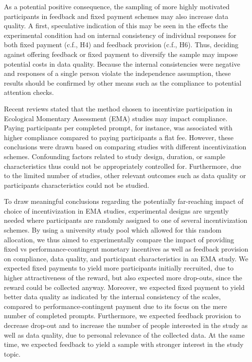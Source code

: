 \documentclass[authordate, empirical,issue]{jote-new-article}
\begin{document}
As a potential positive consequence, the sampling of more highly motivated participants in feedback and fixed payment schemes may also increase data quality. A first, speculative indication of this may be seen in the effects the experimental condition had on internal consistency of individual responses for both fixed payment (c.f., H4) and feedback provision (c.f., H6). Thus, deciding against offering feedback or fixed payment to diversify the sample may impose potential costs in data quality. Because the internal consistencies were negative and responses of a single person violate the independence assumption, these results should be confirmed by other means such as the compliance to potential attention checks.

\begin{originalPurpose}




  Recent reviews stated that the method chosen to incentivize participation in Ecological Momentary Assessment (EMA) studies may impact compliance. Paying participants per completed prompt, for instance, was associated with higher compliance compared to paying participants a flat fee. However, these conclusions were drawn based on comparing studies with different incentivization schemes. Confounding factors related to study design, duration, or sample characteristics thus could not be appropriately controlled for. Furthermore, due to the limited number of studies, other relevant outcomes such as data quality or participants characteristics could not be studied.

  To draw meaningful conclusions regarding the potentially far-reaching impact of choice of incentivization in EMA studies, experimental designs are urgently needed where participants are randomly assigned to one of several incentivization schemes. By using a university study pool which allowed for this random allocation, we thus aimed to experimentally compare the impact of providing fixed vs performance-contingent monetary incentives as well as feedback provision on compliance, data quality, and participant characteristics in an EMA study. We expected fixed payments to yield more participants initially recruited, due to higher attractiveness of the reward, but also expected more drop-outs, since the reward could be collected anyway. Moreover, we expected fixed payment to yield better data quality as indicated by the internal consistency of the scales, compared to performance-contingent payment due to its focus on the mere number of completed prompts. Furthermore, we expected feedback provision to decrease drop-out and to increase the number of people interested in the study as well as data quality, due to personal relevance of the collected data. At the same time, we expected feedback to yield a sample with stronger interest in the study topic.
\end{originalPurpose}
\end{document}
